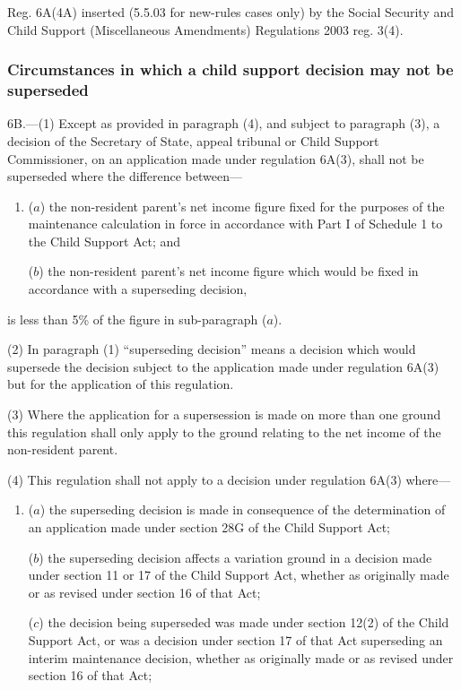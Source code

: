 \documentclass[12pt,a4paper]{article}
\begin{document}
{{Reg. 6A(4A) inserted (5.5.03 for new-rules cases only) by the Social Security and Child Support (Miscellaneous Amendments) Regulations 2003 reg. 3(4).
}

\subsubsection[6B. Circumstances in which a child support decision may not be superseded]{Circumstances in which a child support decision may not be superseded}

6B.---(1)  Except as provided in paragraph (4), and subject to paragraph (3), a decision of the Secretary of State, appeal tribunal or Child Support Commissioner, on an application made under regulation 6A(3), shall not be superseded where the difference between—
\begin{enumerate}\item[]
($a$) the non-resident parent’s net income figure fixed for the purposes of the maintenance calculation in force in accordance with Part I of Schedule 1 to the Child Support Act; and

($b$) the non-resident parent’s net income figure which would be fixed in accordance with a superseding decision,
\end{enumerate}
is less than 5\% of the figure in sub-paragraph ($a$).

(2) In paragraph (1) “superseding decision” means a decision which would supersede the decision subject to the application made under regulation 6A(3) but for the application of this regulation.

(3) Where the application for a supersession is made on more than one ground this regulation shall only apply to the ground relating to the net income of the non-resident parent.

(4) This regulation shall not apply to a decision under regulation 6A(3) where—
\begin{enumerate}\item[]
($a$) the superseding decision is made in consequence of the determination of an application made under section 28G of the Child Support Act;

($b$) the superseding decision affects a variation ground in a decision made under section 11 or 17 of the Child Support Act, whether as originally made or as revised under section 16 of that Act;

($c$) the decision being superseded was made under section 12(2) of the Child Support Act, or was a decision under section 17 of that Act superseding an interim maintenance decision, whether as originally made or as revised under section 16 of that Act;


\end{enumerate}}
\end{document}
